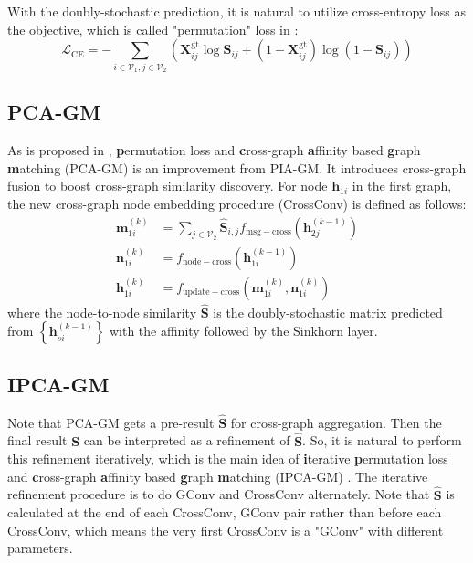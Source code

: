 \documentclass[a4paper]{article}
\newcommand{\set}[1]{\left\{#1\right\}}
\begin{document}
With the doubly-stochastic prediction, it is natural to utilize cross-entropy loss as the objective, which is called "permutation" loss in \cite{pca-ipca}:
$$
\mathcal{L}_{\mathrm{CE}} = -\sum_{i\in \mathcal{V}_1, j\in \mathcal{V}_2 } \left(\mathbf{X}_{ij}^{\mathrm{gt}} \log\mathbf{S}_{ij} + \left(1-\mathbf{X}_{ij}^{\mathrm{gt}}\right) \log \left(1- \mathbf{S}_{ij}\right) \right)
$$

\subsection{PCA-GM}
As is proposed in \cite{pca-ipca}, \textbf{p}ermutation loss and \textbf{c}ross-graph \textbf{a}ffinity based \textbf{g}raph \textbf{m}atching (PCA-GM) is an improvement from PIA-GM. It introduces cross-graph fusion to boost cross-graph similarity discovery. For node $\mathbf{h}_{1i}$ in the first graph, the new cross-graph node embedding procedure (CrossConv) is defined as follows:
\begin{align}
    \mathbf{m}_{1i}^{(k)} &= \sum_{j\in \mathcal{V}_2} \hat{\mathbf{S}}_{i,j} f_{\mathrm{msg-cross}}\left(\mathbf{h}_{2j}^{(k-1)}\right)\\
    \mathbf{n}_{1i}^{(k)} &= f_{\mathrm{node-cross}}\left( \mathbf{h}_{1i}^{(k-1)} \right)\\
    \mathbf{h}_{1i}^{(k)} &= f_{\mathrm{update-cross}}\left( \mathbf{m}_{1i}^{(k)}, \mathbf{n}_{1i}^{(k)} \right)
\end{align}
where the node-to-node similarity $\hat{\mathbf{S}}$ is the doubly-stochastic matrix predicted from $\set{\mathbf{h}_{si}^{(k-1)}}$ with the affinity followed by the Sinkhorn layer.

\subsection{IPCA-GM}
Note that PCA-GM gets a pre-result $\hat{\mathbf{S}}$ for cross-graph aggregation. Then the final result $\mathbf{S}$ can be interpreted as a refinement of $\hat{\mathbf{S}}$. So, it is natural to perform this refinement iteratively, which is the main idea of \textbf{i}terative \textbf{p}ermutation loss and \textbf{c}ross-graph \textbf{a}ffinity based \textbf{g}raph \textbf{m}atching (IPCA-GM) \cite{pca-ipca}. The iterative refinement procedure is to do GConv and CrossConv alternately. Note that $\hat{\mathbf{S}}$ is calculated at the end of each CrossConv, GConv pair rather than before each CrossConv, which means the very first CrossConv is a "GConv" with different parameters.
\end{document}
